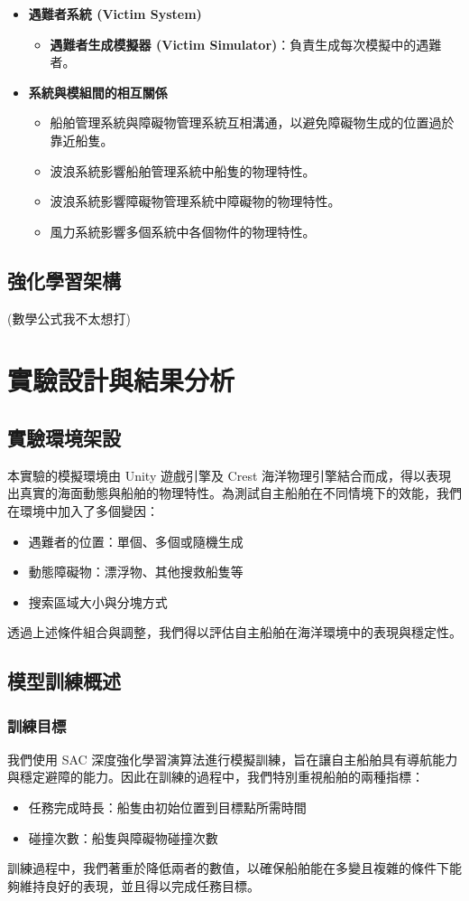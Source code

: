 \documentclass[12pt,a4paper]{article}
\begin{document}
\begin{itemize}
	 \item \textbf{遇難者系統 (Victim System)}
	\begin{itemize}
	    \item \textbf{遇難者生成模擬器 (Victim Simulator)}：負責生成每次模擬中的遇難者。
	\end{itemize}
	
	 \item \textbf{系統與模組間的相互關係}
	\begin{itemize}
	    \item 船舶管理系統與障礙物管理系統互相溝通，以避免障礙物生成的位置過於靠近船隻。
	    \item 波浪系統影響船舶管理系統中船隻的物理特性。
	    \item 波浪系統影響障礙物管理系統中障礙物的物理特性。
	    \item 風力系統影響多個系統中各個物件的物理特性。
	\end{itemize}

\end{itemize}

\subsection{強化學習架構}
(數學公式我不太想打)

\section{實驗設計與結果分析}

\subsection{實驗環境架設}
本實驗的模擬環境由 Unity 遊戲引擎及 Crest 海洋物理引擎結合而成，得以表現出真實的海面動態與船舶的物理特性。為測試自主船舶在不同情境下的效能，我們在環境中加入了多個變因：
\begin{itemize}
    \item 遇難者的位置：單個、多個或隨機生成
    \item 動態障礙物：漂浮物、其他搜救船隻等
    \item 搜索區域大小與分塊方式
\end{itemize}
透過上述條件組合與調整，我們得以評估自主船舶在海洋環境中的表現與穩定性。

\subsection{模型訓練概述}
\subsubsection{訓練目標}
我們使用 SAC 深度強化學習演算法進行模擬訓練，旨在讓自主船舶具有導航能力與穩定避障的能力。因此在訓練的過程中，我們特別重視船舶的兩種指標：
\begin{itemize}
    \item 任務完成時長：船隻由初始位置到目標點所需時間
    \item 碰撞次數：船隻與障礙物碰撞次數
\end{itemize}
訓練過程中，我們著重於降低兩者的數值，以確保船舶能在多變且複雜的條件下能夠維持良好的表現，並且得以完成任務目標。
\end{document}
